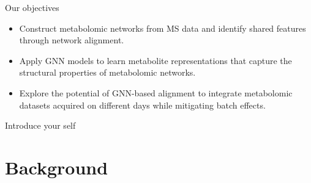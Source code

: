 \documentclass[aspectratio=169]{beamer}
\newcommand{\source}[1]{\par\tiny Source: #1} %
\begin{document}
\begin{frame}{Our objectives}
        \begin{itemize}
            \item Construct metabolomic networks from MS data and identify shared features through network alignment.
            
            \item Apply GNN models to learn metabolite representations that capture the structural properties of metabolomic networks.
            
            \item Explore the potential of GNN-based alignment to integrate metabolomic datasets acquired on different days while mitigating batch effects.
        \end{itemize}

        \begin{note}
            {Introduce your self}
        \end{note}
    \end{frame}

\section{Background}



\end{document}
